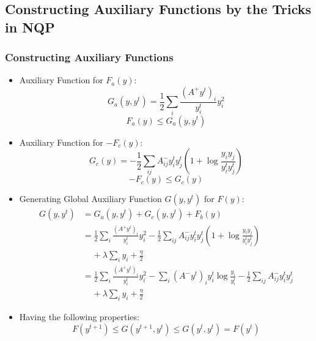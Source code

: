\documentclass{beamer}
\begin{document}
\subsection{Constructing Auxiliary Functions by the Tricks in NQP}
\begin{frame}\frametitle{Constructing Auxiliary Functions}
\begin{itemize}
\item Auxiliary Function for $F_a(y)$:
\begin{equation}\label{eq33}
G_a(y,y^t)=\frac{1}{2}\sum_i\frac{(A^+y^t)_i}{y_i^t}y_i^2
\end{equation}
\begin{equation}\label{eq34}
F_a(y)\leq G_a(y,y^t)
\end{equation}
\item Auxiliary Function for $-F_c(y)$:
\begin{equation}\label{eq35}
G_c(y)=-\frac{1}{2}\sum_{ij}A_{ij}^-y_i^ty_j^t(1+\log\frac{y_iy_j}{y_i^ty_j^t})
\end{equation}
\begin{equation}\label{eq36}
-F_c(y)\leq G_c(y)
\end{equation}
\end{itemize}
\end{frame}

\begin{frame}
\begin{itemize}
\item Generating Global Auxiliary Function $G(y,y^t)$ for $F(y)$:
\begin{equation}\label{eq37}
\begin{split}
G(y,y^t)&=G_a(y,y^t)+G_c(y,y^t)+F_b(y)\\
&=\frac{1}{2}\sum_i{\frac{(A^+y^t)_i}{y_i^t}}y_i^2-\frac{1}{2}\sum_{ij}{A_{ij}^-y_i^ty_j^t(1+\log\frac{y_iy_j}{y_i^ty_j^t})}\\
&\;\;\;\;+\lambda\sum_i y_i+\frac{\eta}{2}\\
&=\frac{1}{2}\sum_i{\frac{(A^+y^t)_i}{y_i^t}}y_i^2-\sum_i(A^-y^t)_iy_i^t\log\frac{y_i}{y_i^t}-\frac{1}{2}\sum_{ij}A_{ij}^-y_i^ty_j^t\\
&\;\;\;\;+\lambda\sum_i y_i+\frac{\eta}{2}
\end{split}
\end{equation}
\item Having the following properties:
\begin{equation}\label{eq38}
F(y^{t+1})\leq G(y^{t+1},y^t)\leq G(y^t,y^t)=F(y^t)
\end{equation}
\end{itemize}
\end{frame}
\end{document}
